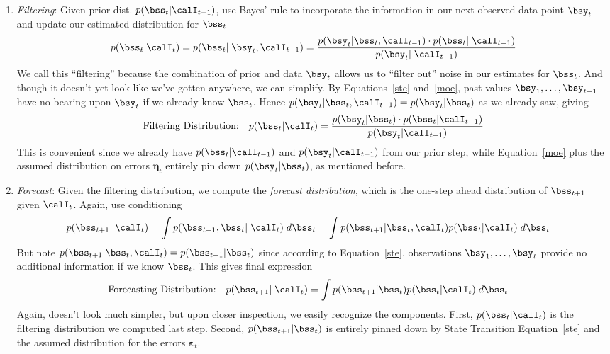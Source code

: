 \documentclass[12pt]{article}
\theoremstyle{plain}
\theoremstyle{definition}
\theoremstyle{remark}
\newcommand{\bseta}{\boldsymbol{\eta}}
\newcommand{\bsvarepsilon}{\boldsymbol{\varepsilon}}
\begin{document}
\begin{enumerate}
  \item \emph{Filtering}:
    Given prior dist. $p(\bss_t|\calI_{t-1})$, use Bayes' rule to
    incorporate the information in our next observed data point $\bsy_t$
    and update our estimated distribution for $\bss_t$
    \begin{align*}
      p(\bss_t | \calI_{t}) =
      p(\bss_t | \; \bsy_t, \calI_{t-1}) =
      \frac{p(\bsy_t | \bss_t, \calI_{t-1})
        \cdot p(\bss_t|\; \calI_{t-1})
      }{p(\bsy_t | \; \calI_{t-1})}
    \end{align*}
    We call this ``filtering'' because the combination of prior and data
    $\bsy_t$ allows us to ``filter out'' noise in our estimates for
    $\bss_t$.
    And though it doesn't yet look like we've gotten anywhere, we
    can simplify. By Equations~\ref{ste} and~\ref{moe}, past values
    $\bsy_1, \ldots, \bsy_{t-1}$ have no bearing upon $\bsy_t$ if we
    already know $\bss_t$.
    Hence $p(\bsy_t|\bss_t, \calI_{t-1}) = p(\bsy_t|\bss_t)$ as we
    already saw, giving
    \begin{equation}
      \label{filt}
      \text{Filtering Distribution:} \quad
      p(\bss_t | \calI_{t})
      =
      \frac{%
        p(\bsy_t | \bss_t) \cdot
        p(\bss_t | \calI_{t-1})
      }{p(\bsy_t|\calI_{t-1})}
    \end{equation}
    This is convenient since we already have
    $p(\bss_t | \calI_{t-1})$ and $p(\bsy_t|\calI_{t-1})$ from
    our prior step, while Equation~\ref{moe} plus the assumed
    distribution on errors $\bseta_t$ entirely pin down
    $p(\bsy_t|\bss_t)$, as mentioned before.

  \item \emph{Forecast}: Given the filtering distribution, we
    compute the \emph{forecast distribution}, which is the one-step
    ahead distribution of $\bss_{t+1}$ given $\calI_{t}$.
    Again, use conditioning
    \begin{align*}
      p(\bss_{t+1} | \; \calI_{t}) &=
        \int p(\bss_{t+1}, \bss_t |\; \calI_{t}) \; d\bss_t
      = \int p(\bss_{t+1} |  \bss_t, \calI_{t})
        p(\bss_t |  \calI_{t}) \; d\bss_t
    \end{align*}
    But note $p(\bss_{t+1}|\bss_t, \calI_{t})=p(\bss_{t+1}|\bss_t)$
    since according to Equation~\ref{ste}, observations $\bsy_1, \ldots,
    \bsy_t$ provide no additional information if we know $\bss_{t}$.
    This gives final expression
    \begin{align}
      \text{Forecasting Distribution:} \quad
      p(\bss_{t+1} | \; \calI_{t})
      &= \int p(\bss_{t+1} |  \bss_t)
        p(\bss_t |  \calI_{t}) \; d\bss_t
    \end{align}
    Again, doesn't look much simpler, but upon closer inspection, we
    easily recognize the components.
    First, $p(\bss_t|\calI_{t})$ is the filtering distribution we
    computed last step. Second,
    $p(\bss_{t+1}|\bss_t)$ is entirely pinned down by State Transition
    Equation~\ref{ste} and the assumed distribution for the errors
    $\bsvarepsilon_t$.


\end{enumerate}
\end{document}
